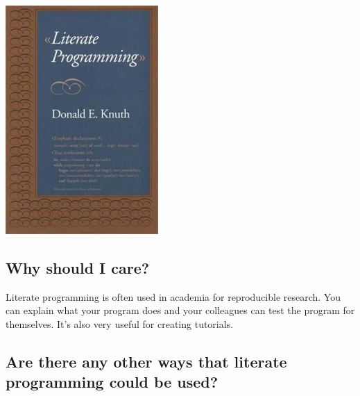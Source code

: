 \documentclass[11pt]{article}
\begin{document}
\begin{center}
\includegraphics[width=.9\linewidth]{../images/literate-programming-book.jpg}
\label{Literate Programming Book}
\end{center}

\subsection*{Why should I care?}
\label{sec:org670397a}

Literate programming is often used in academia for reproducible research. You
can explain what your program does and your colleagues can test the program for
themselves. It's also very useful for creating tutorials.

\subsection*{Are there any other ways that literate programming could be used?}
\label{sec:org8e6a8a2}
\end{document}
